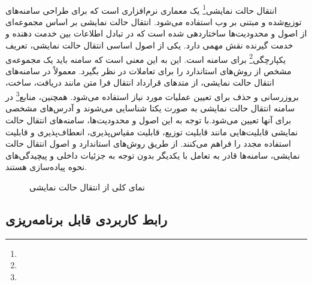 \paragraph{}
{
    انتقال حالت نمایشی\footnote{} یک معماری نرم‌افزاری است که برای طراحی سامنه‌های توزیع‌شده و مبتنی بر وب استفاده می‌شود. انتقال حالت نمایشی بر اساس مجموعه‌ای از اصول و محدودیت‌ها ساختاردهی شده است که در تبادل اطلاعات بین خدمت دهنده‌ و خدمت گیرنده نقش مهمی دارد. یکی از اصول اساسی انتقال حالت نمایشی، تعریف یکپارچگی\footnote{} برای سامنه است. این به این معنی است که سامنه باید یک مجموعه‌ی مشخص از روش‌های استاندارد را برای تعاملات در نظر بگیرد. معمولاً در سامنه‌های انتقال حالت نمایشی، از متدهای قرارداد انتقال فرا متن مانند دریافت، ساخت، بروزرسانی و حذف برای تعیین عملیات مورد نیاز استفاده می‌شود. همچنین، منابع\footnote{} در سامنه انتقال حالت نمایشی به صورت یکتا شناسایی می‌شوند و آدرس‌های مشخصی برای آنها تعیین می‌شود.با توجه به این اصول و محدودیت‌ها، سامنه‌های انتقال حالت نمایشی قابلیت‌هایی مانند قابلیت توزیع، قابلیت مقیاس‌پذیری، انعطاف‌پذیری و قابلیت استفاده مجدد را فراهم می‌کنند. از طریق روش‌های استاندارد و اصول انتقال حالت نمایشی، سامنه‌ها قادر به تعامل با یکدیگر بدون توجه به جزئیات داخلی و پیچیدگی‌های نحوه پیاده‌سازی هستند.   
    \begin{figure}[H]
        \caption{نمای کلی از انتقال حالت نمایشی}
        \label{fig:rest}
    \end{figure}
}

\subsection{رابط کاربردی قابل برنامه‌ریزی}
\label{subsecsec:api}
